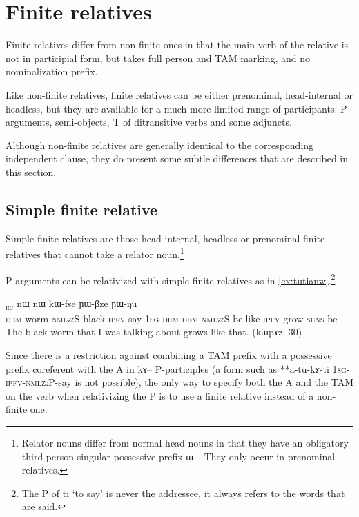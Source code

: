 \documentclass[oldfontcommands,oneside,a4paper,11pt]{article}
\newcommand{\ipa}[1]{{\phon #1}} %
\newcommand{\topic}{\textsc{dem}}
\newcommand{\tete}{\textsuperscript{\textsc{head}}}
\newcommand{\rc}{\textsubscript{\textsc{rc}}}
\begin{document}
\section{Finite relatives} \label{sec:finite}
Finite relatives differ from non-finite ones in that the main verb of the relative is not in participial form, but takes full person and TAM marking, and no nominalization prefix.

Like non-finite relatives, finite relatives can be either prenominal, head-internal or headless, but they are available for a much more limited range of participants: P arguments, semi-objects, T of ditransitive verbs and some adjuncts. 

Although non-finite relatives are generally identical to the corresponding independent clause, they do present some subtle differences that are described in this section.

\subsection{Simple finite relative} \label{sec:finite.P}
Simple finite relatives are those head-internal, headless or prenominal finite relatives that cannot take a  relator noun.\footnote{Relator nouns differ from normal head nouns in that they have an obligatory third person singular possessive prefix \ipa{ɯ--}. They only occur in prenominal relatives.}  

P arguments can be relativized with simple finite relatives as in \ref{ex:tutianw}.\footnote{The P of \ipa{ti} `to say' is never the addressee, it always refers to the words that are said.} 

     \begin{exe}
   \ex \label{ex:tutianw}
 \gll [\ipa{nɯ}  	\ipa{qajɯ}\tete{}  	\ipa{kɯ-ɲaʁ}  	\ipa{tu-ti-a}]\rc{}  	\ipa{nɯ}  	\ipa{nɯ}  	\ipa{kɯ-fse}  	\ipa{ɲɯ-βze}  	\ipa{ɲɯ-ŋu}  \\
\textsc{dem} worm \textsc{nmlz:S}-black \textsc{ipfv}-say-\textsc{1sg} \topic{} \textsc{dem} \textsc{nmlz:S}-be.like \textsc{ipfv}-grow \textsc{sens}-be \\
\glt The black worm that I was talking about grows like that. (\ipa{kɯpɤz}, 30)
\end{exe}

Since there is a restriction against combining a TAM prefix with a possessive prefix coreferent with the A in \ipa{kɤ--} P-participles (a form such as **\ipa{a-tu-kɤ-ti} \textsc{1sg-ipfv-nmlz:P}-say is not possible), the only way to specify both the A and the TAM on the verb when relativizing the P is to use a finite relative instead of a non-finite one.
\end{document}
